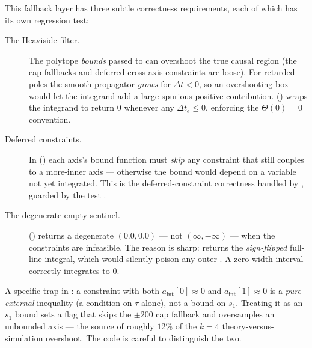 This fallback layer has three subtle correctness requirements, each of which has
its own regression test:

\begin{description}
  \item[The Heaviside filter.] The polytope \emph{bounds} passed to 
        can overshoot the true causal region (the cap fallbacks and deferred
        cross-axis constraints are loose). For retarded poles the smooth
        propagator \emph{grows} for $\Delta t < 0$, so an overshooting box would
        let the integrand add a large spurious positive contribution.
        () wraps the integrand to return $0$
        whenever any $\Delta t_e \le 0$, enforcing the $\Theta(0)=0$ convention.
  \item[Deferred constraints.] In 
        () each axis's bound function must
        \emph{skip} any constraint that still couples to a more-inner axis ---
        otherwise the bound would depend on a variable not yet integrated. This is
        the deferred-constraint correctness handled by ,
        guarded by the test
        .
  \item[The degenerate-empty sentinel.] 
        () returns a degenerate $(0.0, 0.0)$ --- not
        $(\infty, -\infty)$ --- when the constraints are infeasible. The reason is
        sharp:  returns the \emph{sign-flipped}
        full-line integral, which would silently poison any outer .
        A zero-width interval correctly integrates to $0$.
\end{description}

\begin{gotcha}
A specific trap in : a constraint with both
$a_{\text{int}}[0]\approx 0$ and $a_{\text{int}}[1]\approx 0$ is a
\emph{pure-external} inequality (a condition on $\tau$ alone), not a bound on
$s_1$. Treating it as an $s_1$ bound sets a  flag that
skips the $\pm 200$ cap fallback and oversamples an unbounded axis --- the source
of roughly $12\%$ of the $k=4$ theory-versus-simulation overshoot. The code is
careful to distinguish the two.
\end{gotcha}

